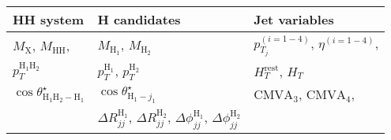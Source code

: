 \documentclass[border=5pt]{standalone}
\begin{document}
  \minipage{18cm}

  \centering
  \small
  
  \begin{tabular}{l l l}
   \hline
   HH system     &  H candidates      & Jet variables \\
   \hline
   $M_\textrm{X}$, $M_\textrm{HH}$, &
   $M_{\textrm{H}_1}$, $M_{\textrm{H}_2}$  &
   $p_{T_j}^{(i=1-4)}$, $\eta^{(i=1-4)}$,  \\
   $p_T^{\textrm{H}_1 \textrm{H}_2}$        &
   $p_T^{\textrm{H}_1}$, $p_T^{\textrm{H}_2}$ &
   $H_T^{\textrm{rest}}$, $H_T$ \\
   $\cos \theta_{\textrm{H}_1 \textrm{H}_2 -\textrm{H}_1}^{\star}$ &
   $\cos \theta_{\textrm{H}_1 -j_1}^{\star}$ &
   $\textrm{CMVA}_3$, $\textrm{CMVA}_4$, \\
   &
   $\Delta R_{jj}^{\textrm{H}_1}$, $\Delta R_{jj}^{\textrm{H}_2}$,
   $\Delta \phi_{jj}^{\textrm{H}_1}$, $\Delta \phi_{jj}^{\textrm{H}_2}$ & \\
   \hline
 \end{tabular}

  \endminipage
\end{document}
